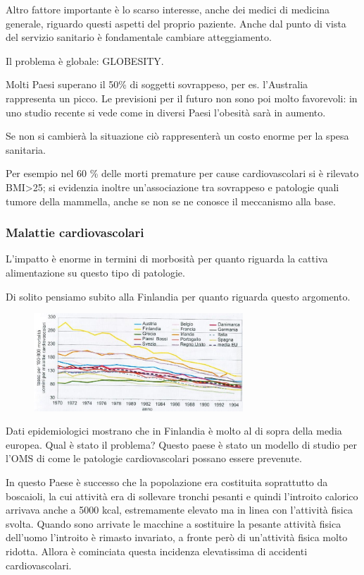 Altro fattore importante è lo scarso interesse, anche dei medici di
medicina generale, riguardo questi aspetti del proprio paziente. Anche
dal punto di vista del servizio sanitario è fondamentale cambiare
atteggiamento.

Il problema è globale: GLOBESITY.

Molti Paesi superano il 50\% di soggetti sovrappeso, per es. l'Australia
rappresenta un picco. Le previsioni per il futuro non sono poi molto
favorevoli: in uno studio recente si vede come in diversi Paesi
l'obesità sarà in aumento.

Se non si cambierà la situazione ciò rappresenterà un costo enorme per
la spesa sanitaria.

Per esempio nel 60 \% delle morti premature per cause cardiovascolari si
è rilevato BMI\textgreater{}25; si evidenzia inoltre un'associazione tra
sovrappeso e patologie quali tumore della mammella, anche se non se ne
conosce il meccanismo alla base.

\subsubsection{Malattie cardiovascolari}

L'impatto è enorme in termini di morbosità per quanto riguarda la
cattiva alimentazione su questo tipo di patologie.

Di solito pensiamo subito alla Finlandia per quanto riguarda questo
argomento.

\begin{figure}[!ht]
\centering
	\includegraphics[width=0.7\textwidth]{20/image12.jpeg}
	\end{figure}

Dati epidemiologici mostrano che in Finlandia è molto al di sopra della
media europea. Qual è stato il problema? Questo paese è stato un modello
di studio per l'OMS di come le patologie cardiovascolari possano essere
prevenute.

In questo Paese è successo che la popolazione era costituita soprattutto
da boscaioli, la cui attività era di sollevare tronchi pesanti e quindi
l'introito calorico arrivava anche a 5000 kcal, estremamente elevato ma
in linea con l'attività fisica svolta. Quando sono arrivate le macchine
a sostituire la pesante attività fisica dell'uomo l'introito è rimasto
invariato, a fronte però di un'attività fisica molto ridotta. Allora è
cominciata questa incidenza elevatissima di accidenti cardiovascolari.

